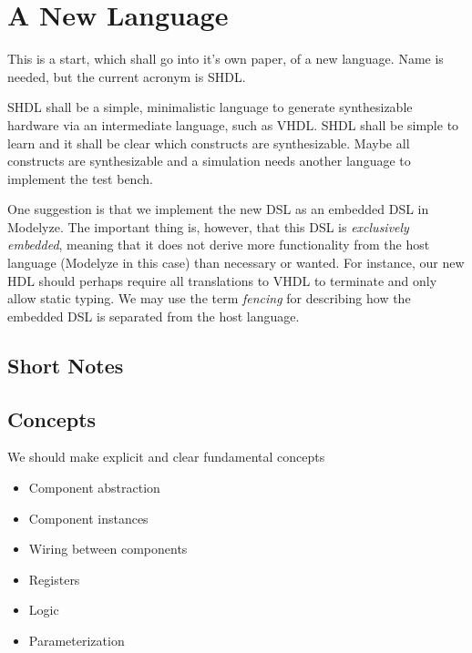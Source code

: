 
\section{A New Language}

This is a start, which shall go into it's own paper, of a new language.
Name is needed, but the current acronym is SHDL.

SHDL shall be a simple, minimalistic language to generate synthesizable
hardware via an intermediate language, such as VHDL. SHDL shall
be simple to learn and it shall be clear which constructs are synthesizable.
Maybe all constructs are synthesizable and a simulation needs another
language to implement the test bench.

One suggestion is that we implement the new DSL as an embedded DSL in
Modelyze. The important thing is, however, that this DSL is
\emph{exclusively embedded}, meaning that it does not derive more
functionality from the host language (Modelyze in this case) than
necessary or wanted. For instance, our new HDL should perhaps require
all translations to VHDL to terminate and only allow static
typing. We may use the term \emph{fencing} for describing
how the embedded DSL is separated from the host language.


\subsection{Short Notes}



\subsection{Concepts}
We should make explicit and clear fundamental concepts

\begin{itemize}
\item Component abstraction
\item Component instances
\item Wiring between components
\item Registers
\item Logic
\item Parameterization
\end{itemize}


